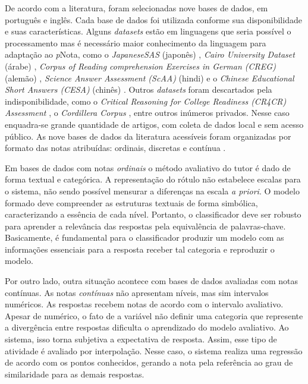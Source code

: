 De acordo com a literatura, foram selecionadas nove bases de dados, em português e inglês. Cada base de dados foi utilizada conforme sua disponibilidade e suas características. Alguns \textit{datasets} estão em linguagens que seria possível o processamento mas é necessário maior conhecimento da linguagem para adaptação ao \textit{p}Nota, como o \textit{JapaneseSAS} (japonês) \cite{ishioka2017}, \textit{Cairo University Dataset} (árabe) \cite{gomaa2019}, \textit{Corpus of Reading comprehension Exercises in German (CREG)} (alemão) \cite{ziai2012}, \textit{Science Answer Assessment (ScAA)} (hindi) \cite{agarwal2020} e o \textit{Chinese Educational Short Answers (CESA)} (chinês) \cite{ding2020}. Outros \textit{datasets} foram descartados pela indisponibilidade, como o \textit{Critical Reasoning for College Readiness (CR4CR) Assessment} \cite{condor2021}, o \textit{Cordillera Corpus} \cite{zhang2020}, entre outros inúmeros privados. Nesse caso enquadra-se grande quantidade de artigos, com coleta de dados local e sem acesso público. As nove bases de dados da literatura acessíveis foram organizadas por formato das notas atribuídas: ordinais, discretas e contínua \cite{morettin2010}. 

Em bases de dados com notas \textit{ordinais} o método avaliativo do tutor é dado de forma textual e categórica. A representação do rótulo não estabelece escalas para o sistema, não sendo possível mensurar a diferenças na escala \textit{a priori}. O modelo formado deve compreender as estruturas textuais de forma simbólica, caracterizando a essência de cada nível. Portanto, o classificador deve ser robusto para aprender a relevância das respostas pela equivalência de palavras-chave. Basicamente, é fundamental para o classificador produzir um modelo com as informações essenciais para a resposta receber tal categoria e reproduzir o modelo.

Por outro lado, outra situação acontece com bases de dados avaliadas com notas contínuas. As notas \textit{contínuas} não apresentam níveis, mas sim intervalos numéricos. As respostas recebem notas de acordo com o intervalo avaliativo. Apesar de numérico, o fato de a variável não definir uma categoria que represente a divergência entre respostas dificulta o aprendizado do modelo avaliativo. Ao sistema, isso torna subjetiva a expectativa de resposta. Assim, esse tipo de atividade é avaliado por interpolação. Nesse caso, o sistema realiza uma regressão de acordo com os pontos conhecidos, gerando a nota pela referência ao grau de similaridade para as demais respostas.

